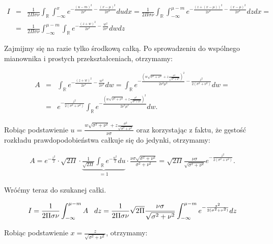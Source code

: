 \documentclass{mini}
\begin{document}
\begin{eqnarray*}
I &=&
\frac{1}{2\Pi\sigma\nu}\int_\mathbb{R}\int_{-\infty}^{x} e^{-\frac{(u-m)^2}{2\nu^2} - \frac{(x-\mu)^2}{2\sigma^2}} du dx
=
\frac{1}{2\Pi\sigma\nu}\int_\mathbb{R}\int_{-\infty}^{\mu-m} e^{-\frac{(z+(x-\mu))^2}{2\nu^2} - \frac{(x-\mu)^2}{2\sigma^2}} dz dx=\\
&=&
\frac{1}{2\Pi\sigma\nu}\int_{-\infty}^{\mu-m}\int_\mathbb{R} e^{-\frac{(z+w)^2}{2\nu^2} - \frac{w^2}{2\sigma^2}} dw dz
\end{eqnarray*}

Zajmijmy się na razie tylko środkową całką. Po sprowadzeniu do wspólnego mianownika i prostych przekształceniach, otrzymamy:

\begin{eqnarray*}
A &=& \int_\mathbb{R} e^{-\frac{(z+w)^2}{2\nu^2} - \frac{w^2}{2\sigma^2}} dw
=
\int_\mathbb{R} e^{-\frac{\left(w\sqrt{\sigma^2+\nu^2} + z\frac{\sigma^2}{\sqrt{\sigma^2+\nu^2}}\right)^2}{2\nu^2\mu^2} - \frac{z^2}{2(\sigma^2+\nu^2)}} dw=\\
&=&
e^{- \frac{z^2}{2(\sigma^2+\nu^2)}}\int_\mathbb{R} e^{-\frac{\left(w\sqrt{\sigma^2+\nu^2} + z\frac{\sigma^2}{\sqrt{\sigma^2+\nu^2}}\right)^2}{2\nu^2\mu^2}} dw.
\end{eqnarray*}

Robiąc podstawienie $u = \frac{w\sqrt{\sigma^2+\nu^2} + z\frac{\sigma^2}{\sqrt{\sigma^2+\nu^2}}}{\nu\sigma}$ oraz korzystając z faktu, że gęstość rozkładu prawdopodobieństwa całkuje się do jedynki, otrzymamy:

\begin{eqnarray*}
A = e^{-\frac{z^2}{2}}\cdot \sqrt{2\Pi}\cdot \underbrace{\frac{1}{\sqrt{2\Pi}} \int_{\mathbb{R}} e^{-\frac{u^2}{2}} du}_{=1} \cdot\frac{\nu\sigma\sqrt{\sigma^2+\nu^2}}{\sigma^2+\nu^2}
=
\sqrt{2\Pi}\frac{\nu\sigma}{\sqrt{\sigma^2+\nu^2}}e^{-\frac{z^2}{2(\sigma^2+\nu^2)}}.
\end{eqnarray*}

Wróćmy teraz do szukanej całki.

\begin{eqnarray*}
I = 
\frac{1}{2\Pi\sigma\nu} \int_{-\infty}^{\mu-m} A\hspace{3mm} dz
=
\frac{1}{2\Pi\sigma\nu} \sqrt{2\Pi}\frac{\nu\sigma}{\sqrt{\sigma^2+\nu^2}}  \int_{-\infty}^{\mu-m} e^{-\frac{z^2}{2(\sigma^2+\nu^2)}} dz
\end{eqnarray*}

Robiąc podstawienie $x = \frac{z}{\sqrt{\sigma^2+\nu^2}}$, otrzymamy:
\end{document}
